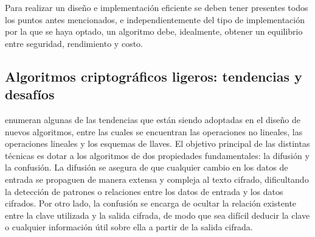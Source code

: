 \documentclass[a4paper,10pt]{article}
\begin{document}
	Para realizar un diseño e implementación eficiente se deben tener presentes todos los puntos antes mencionados, e independientemente del tipo de implementación por la que se haya optado, un algoritmo debe, idealmente, obtener un equilibrio entre seguridad, rendimiento y costo.
	\subsection{Algoritmos criptográficos ligeros: tendencias y desafíos}
	\label{sec.2.1}
	\textcite{biryukov2017state} enumeran algunas de las tendencias que están siendo adoptadas en el diseño de nuevos algoritmos, entre las cuales se encuentran las operaciones no lineales, las operaciones lineales y los esquemas de llaves. El objetivo principal de las distintas técnicas es dotar a los algoritmos de dos propiedades fundamentales: la difusión y la confusión. La difusión se asegura de que cualquier cambio en los datos de entrada se propaguen de manera extensa y compleja al texto cifrado, dificultando la detección de patrones o relaciones entre los datos de entrada y los datos cifrados. Por otro lado, la confusión se encarga de ocultar la relación existente entre la clave utilizada y la salida cifrada, de modo que sea difícil deducir la clave o cualquier información útil sobre ella a partir de la salida cifrada.
	
\end{document}
